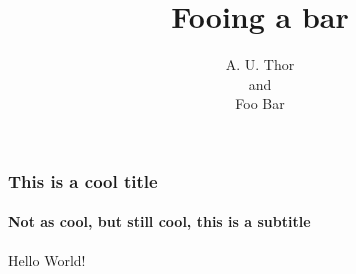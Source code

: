 \documentclass[aspectratio=169]{beamer}
\author[A. U. Thor, Foo Bar]{A. U. Thor\\and\\Foo Bar}
\title{Fooing a bar}
\begin{document}
  \begin{frame}
    \maketitle
  \end{frame}
  \begin{frame}
    \frametitle{This is a cool title}
    \framesubtitle{Not as cool, but still cool, this is a subtitle}
    Hello World!
  \end{frame}
\end{document}
